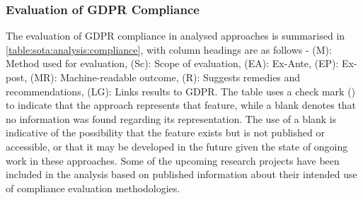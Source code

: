 \subsubsection{Evaluation of GDPR Compliance}\label{sota:analysis:compliance}
The evaluation of GDPR compliance in analysed approaches is summarised in \autoref{table:sota:analysis:compliance}, with column headings are as follows - (M): Method used for evaluation, (Sc): Scope of evaluation, (EA): Ex-Ante, (EP): Ex-post, (MR): Machine-readable outcome, (R): Suggests remedies and recommendations, (LG): Links results to GDPR.
The table uses a check mark (\cmark) to indicate that the approach represents that feature, while a blank denotes that no information was found regarding its representation. The use of a blank is indicative of the possibility that the feature exists but is not published or accessible, or that it may be developed in the future given the state of ongoing work in these approaches.
Some of the upcoming research projects have been included in the analysis based on published information about their intended use of compliance evaluation methodologies.
